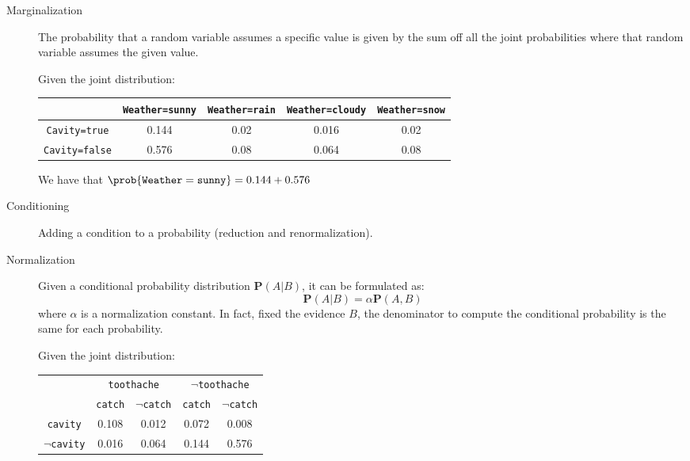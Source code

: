 \begin{description}
    \item[Marginalization] 
        The probability that a random variable assumes a specific value is given by 
        the sum off all the joint probabilities where that random variable assumes the given value.
        \begin{example}
            Given the joint distribution:
            \begin{center}
                \small
                \begin{tabular}{c | cccc}
                                            & \texttt{Weather=sunny} & \texttt{Weather=rain} & \texttt{Weather=cloudy} & \texttt{Weather=snow} \\
                    \hline
                    \texttt{Cavity=true}    & 0.144 & 0.02 & 0.016 & 0.02 \\
                    \texttt{Cavity=false}   & 0.576 & 0.08 & 0.064 & 0.08
                \end{tabular}
            \end{center}
            We have that $\prob{\texttt{Weather}=\texttt{sunny}} = 0.144 + 0.576$
        \end{example}
    \item[Conditioning] 
        Adding a condition to a probability (reduction and renormalization).

    \item[Normalization] 
        Given a conditional probability distribution $\textbf{P}(A \vert B)$,
        it can be formulated as:
        \[ \textbf{P}(A \vert B) = \alpha\textbf{P}(A, B) \]
        where $\alpha$ is a normalization constant.
        In fact, fixed the evidence $B$, the denominator to compute the conditional probability is the same for each probability.

        \begin{example}
            Given the joint distribution:
            \begin{center}
                \begin{tabular}{|c|c|c|c|c|}
                    \cline{2-5}
                    \multicolumn{1}{c|}{}    & \multicolumn{2}{c|}{\texttt{toothache}} & \multicolumn{2}{c|}{$\lnot$\texttt{toothache}} \\
                    \cline{2-5}
                    \multicolumn{1}{c|}{}    & \texttt{catch} & $\lnot$\texttt{catch} & \texttt{catch} & $\lnot$\texttt{catch} \\
                    \hline
                    \texttt{cavity}         & 0.108 & 0.012 & 0.072 & 0.008 \\
                    $\lnot$\texttt{cavity}  & 0.016 & 0.064 & 0.144 & 0.576 \\
                    \hline
                \end{tabular}
            \end{center}


\end{example}
\end{description}
